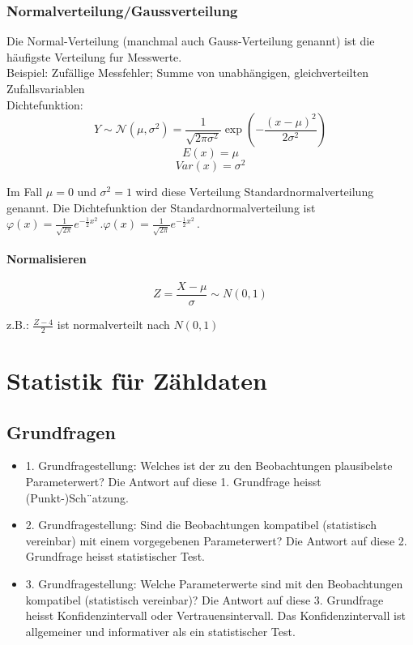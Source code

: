 \documentclass{article}
\begin{document}
\begin{multicols*}{3}
      \subsubsection{Normalverteilung/Gaussverteilung}

      Die Normal-Verteilung (manchmal auch Gauss-Verteilung genannt) ist die häufigste Verteilung fur Messwerte.\\
      Beispiel: Zufällige Messfehler; Summe von unabhängigen, gleichverteilten Zufallsvariablen \\
      Dichtefunktion:
      $${\displaystyle Y\sim {\mathcal {N}}\left(\mu ,\sigma ^{2}\right)}={\frac {1}{\sqrt {2\pi \sigma ^{2}}}}\operatorname {exp} \left(-{\frac {\left(x-\mu \right)^{2}}{2\sigma ^{2}}}\right)$$
      $$E(x) = \mu$$
      $$Var(x) = \sigma^2$$

      Im Fall $\mu =0$ und $\sigma ^{2}=1$ wird diese Verteilung Standardnormalverteilung genannt. Die Dichtefunktion der Standardnormalverteilung ist
      ${\displaystyle \varphi (x)={\frac {1}{\sqrt {2\pi }}}e^{-{\frac {1}{2}}x^{2}}\,.} {\displaystyle \varphi (x)={\frac {1}{\sqrt {2\pi }}}e^{-{\frac {1}{2}}x^{2}}\,.}$

      \paragraph{Normalisieren}
      $$Z = \frac{X - \mu}{\sigma} \sim N(0, 1)$$

      z.B.: $\frac{Z-4}{2}$ ist normalverteilt nach $N (0, 1)$

\section{Statistik für Zähldaten}
    \subsection{Grundfragen}
    \begin{itemize}
      \item 1. Grundfragestellung: Welches ist der zu den Beobachtungen plausibelste
      Parameterwert? Die Antwort auf diese 1. Grundfrage heisst (Punkt-)Sch¨atzung.
      \item 2. Grundfragestellung: Sind die Beobachtungen kompatibel (statistisch vereinbar)
      mit einem vorgegebenen Parameterwert? Die Antwort auf diese 2. Grundfrage
      heisst statistischer Test.
      \item 3. Grundfragestellung: Welche Parameterwerte sind mit den Beobachtungen
      kompatibel (statistisch vereinbar)? Die Antwort auf diese 3. Grundfrage
      heisst Konfidenzintervall oder Vertrauensintervall. Das Konfidenzintervall
      ist allgemeiner und informativer als ein statistischer Test.
    \end{itemize}


\end{multicols*}
\end{document}
